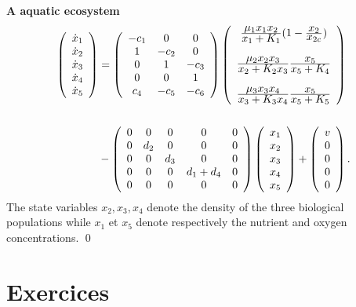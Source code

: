 \begin{exemple} {\bf A aquatic ecosystem}
\begin{equation*} \begin{split}
\bma{c}  \dot x_1 \\ \dot x_2 \\
\dot x_3 \\ \dot x_4 \\ \dot x_5 \ema &= \bma{ccc} -c_1 & 0 & 0\\ 1 & -c_2
& 0 \\ 0 & 1 & -c_3 \\ 0 & 0 & 1 \\ c_4 & -c_5 & -c_6 \ema \bma{c}
\frac{{\textstyle \mu_1 x_1 x_2}}{{\textstyle x_1 + K_1}}(1 -
\frac{{\textstyle x_2}}{{\textstyle x_{2c}}}) \\ 
\\
\frac{{\textstyle \mu_2 x_2 x_3}}{{\textstyle x_2 + K_2x_3}}  \frac{{\textstyle
x_5}}{{\textstyle x_5 +K_4}} \\
\\
\frac{{\textstyle \mu_3 x_3 x_4}}{{\textstyle x_3 + K_3x_4}} \frac{{\textstyle
x_5}}{{\textstyle x_5 +K_5}}
\ema 
\\ & \\&- \bma{ccccc} 0 & 0 & 0 &
0 & 0 \\ 0 & d_2 & 0 & 0 & 0 \\0 & 0 & d_3 & 0 & 0  \\0 & 0 & 0 & d_1 + d_4 & 0
\\0 & 0 & 0 & 0 & 0
\ema \bma{c} x_1 \\  x_2 \\  x_3 \\  x_4 \\ x_5 \ema + \bma{c} v \\ 0  \\ 0 \\
0 \\ 0 \ema.    
\end{split} \end{equation*}
The state variables $x_2,x_3,x_4$ denote the density of the three biological populations 
while $x_1$ et $x_5$ denote respectively the nutrient and oxygen concentrations. \qed
\end{exemple}
 
\section{Exercices}

